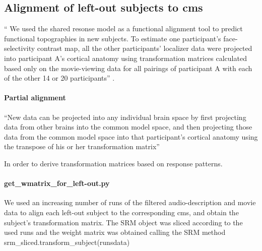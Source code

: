 \subsection{Alignment of left-out subjects to \ac{cms}}

%
`` We used the shared resonse model as a functional alignment tool to predict
functional topographies in new subjects. To estimate one participant's
face-selectivity contrast map, all the other participants' localizer data were
projected into participant A's cortical anatomy using transformation matrices
calculated based only on the movie-viewing data for all pairings of participant
A with each of the other 14 or 20 participants'' \citep{jiahui2020predicting}.


\paragraph{Partial alignment}

%
``New data can be projected into any individual brain space by first projecting
data from other brains into the common model space, and then projecting those
data from the common model space into that participant's cortical anatomy using
the transpose of his or her transformation matrix'' \citep{jiahui2020predicting}



In order to derive transformation matrices based on response patterns.

\paragraph{get\_wmatrix\_for\_left-out.py}

We used an increasing number of runs of the filtered audio-description and movie
data to align each left-out subject to the corresponding \ac{cms}, and obtain
the subject's transformation matrix.
%
The SRM object was sliced according to the used runs and the weight matrix was
obtained calling the SRM method srm\_sliced.transform\_subject(runsdata)

